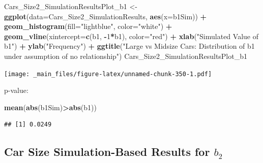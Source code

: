 \documentclass[]{book}
\newenvironment{Shaded}{\begin{snugshade}}{\end{snugshade}}
\newcommand{\KeywordTok}[1]{\textcolor[rgb]{0.13,0.29,0.53}{\textbf{#1}}}
\newcommand{\DataTypeTok}[1]{\textcolor[rgb]{0.13,0.29,0.53}{#1}}
\newcommand{\DecValTok}[1]{\textcolor[rgb]{0.00,0.00,0.81}{#1}}
\newcommand{\StringTok}[1]{\textcolor[rgb]{0.31,0.60,0.02}{#1}}
\newcommand{\OperatorTok}[1]{\textcolor[rgb]{0.81,0.36,0.00}{\textbf{#1}}}
\newcommand{\NormalTok}[1]{#1}
\begin{document}
\begin{Shaded}
\begin{Highlighting}[]
\NormalTok{Cars_Size2_SimulationResultsPlot_b1 <-}\StringTok{ }\KeywordTok{ggplot}\NormalTok{(}\DataTypeTok{data=}\NormalTok{Cars_Size2_SimulationResults, }\KeywordTok{aes}\NormalTok{(}\DataTypeTok{x=}\NormalTok{b1Sim)) }\OperatorTok{+}\StringTok{ }
\StringTok{  }\KeywordTok{geom_histogram}\NormalTok{(}\DataTypeTok{fill=}\StringTok{"lightblue"}\NormalTok{, }\DataTypeTok{color=}\StringTok{"white"}\NormalTok{) }\OperatorTok{+}\StringTok{ }
\StringTok{  }\KeywordTok{geom_vline}\NormalTok{(}\DataTypeTok{xintercept=}\KeywordTok{c}\NormalTok{(b1, }\OperatorTok{-}\DecValTok{1}\OperatorTok{*}\NormalTok{b1), }\DataTypeTok{color=}\StringTok{"red"}\NormalTok{) }\OperatorTok{+}\StringTok{ }
\StringTok{  }\KeywordTok{xlab}\NormalTok{(}\StringTok{"Simulated Value of b1"}\NormalTok{) }\OperatorTok{+}\StringTok{ }\KeywordTok{ylab}\NormalTok{(}\StringTok{"Frequency"}\NormalTok{) }\OperatorTok{+}\StringTok{ }
\StringTok{  }\KeywordTok{ggtitle}\NormalTok{(}\StringTok{"Large vs Midsize Cars: Distribution of b1 under assumption of no relationship"}\NormalTok{)}
\NormalTok{Cars_Size2_SimulationResultsPlot_b1}
\end{Highlighting}
\end{Shaded}

\texttt{[image: \_main\_files/figure-latex/unnamed-chunk-350-1.pdf]}

p-value:

\begin{Shaded}
\begin{Highlighting}[]
\KeywordTok{mean}\NormalTok{(}\KeywordTok{abs}\NormalTok{(b1Sim)}\OperatorTok{>}\KeywordTok{abs}\NormalTok{(b1))}
\end{Highlighting}
\end{Shaded}

\begin{verbatim}
## [1] 0.0249
\end{verbatim}

\subsection{\texorpdfstring{Car Size Simulation-Based Results for
\(b_2\)}{Car Size Simulation-Based Results for b\_2}}\label{car-size-simulation-based-results-for-b_2}
\end{document}
